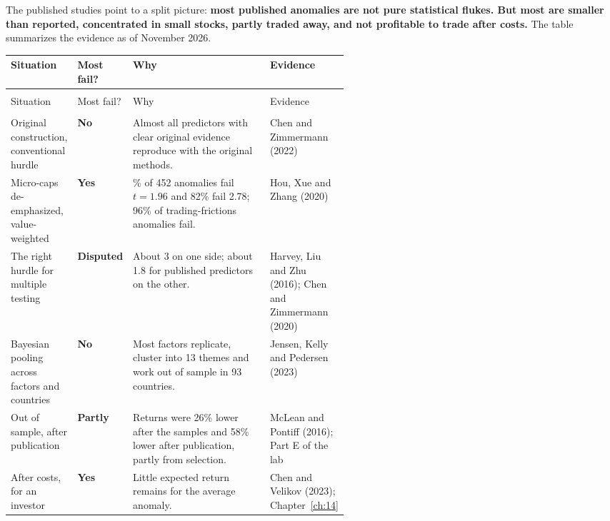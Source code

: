 The published studies point to a split picture: \textbf{most published anomalies are not pure statistical flukes. But most are smaller than reported, concentrated in small stocks, partly traded away, and not profitable to trade after costs.} The table summarizes the evidence as of November 2026.

{\small
\begin{longtable}{@{}>{\raggedright\arraybackslash}p{0.19\linewidth}>{\raggedright\arraybackslash}p{0.13\linewidth}>{\raggedright\arraybackslash}p{}>{\raggedright\arraybackslash}p{0.23\linewidth}@{}}
\toprule
Situation & Most fail? & Why & Evidence \\
\midrule
\endfirsthead
\multicolumn{4}{@{}l}{\emph{(continued)}} \\
\toprule
Situation & Most fail? & Why & Evidence \\
\midrule
\endhead
\midrule
\multicolumn{4}{r@{}}{\emph{(continued on the next page)}} \\
\endfoot
\bottomrule
\endlastfoot
Original construction, conventional hurdle & \textbf{No} & Almost all predictors with clear original evidence reproduce with the original methods. & Chen and Zimmermann (2022) \\*
\addlinespace[3pt]
Micro-caps de-emphasized, value-weighted & \textbf{Yes} & 65\% of 452 anomalies fail $t = 1.96$ and 82\% fail 2.78; 96\% of trading-frictions anomalies fail. & Hou, Xue and Zhang (2020) \\
\addlinespace[3pt]
The right hurdle for multiple testing & \textbf{Disputed} & About 3 on one side; about 1.8 for published predictors on the other. & Harvey, Liu and Zhu (2016); Chen and Zimmermann (2020) \\
\addlinespace[3pt]
Bayesian pooling across factors and countries & \textbf{No} & Most factors replicate, cluster into 13 themes and work out of sample in 93 countries. & Jensen, Kelly and Pedersen (2023) \\
\addlinespace[3pt]
Out of sample, after publication & \textbf{Partly} & Returns were 26\% lower after the samples and 58\% lower after publication, partly from selection. & McLean and Pontiff (2016); Part E of the lab \\*
\addlinespace[3pt]
After costs, for an investor & \textbf{Yes} & Little expected return remains for the average anomaly. & Chen and Velikov (2023); Chapter~\ref{ch:14} \\
\end{longtable}
\addtocounter{table}{-1}%
}

